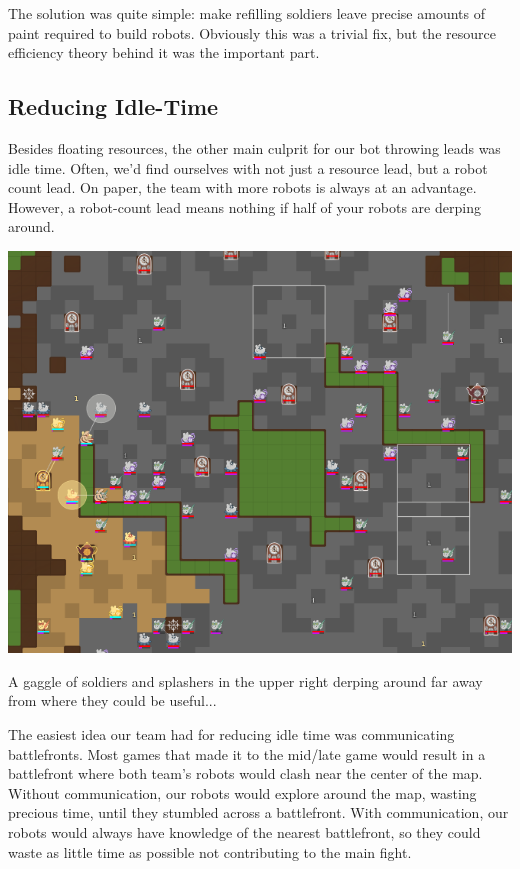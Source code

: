 \medskip

The solution was quite simple: make refilling soldiers leave precise amounts of paint required to build robots. Obviously this was a trivial fix, but the resource efficiency theory behind it was the important part.

\subsection{Reducing Idle-Time}

Besides floating resources, the other main culprit for our bot throwing leads was idle time. Often, we'd find ourselves with not just a resource lead, but a robot count lead. On paper, the team with more robots is always at an advantage. However, a robot-count lead means nothing if half of your robots are derping around.

\begin{center}
    \includegraphics[scale=0.1]{images/idle_time.png}
    \caption{A gaggle of soldiers and splashers in the upper right derping around far away from where they could be useful...}
\end{center}

\medskip

The easiest idea our team had for reducing idle time was communicating battlefronts. Most games that made it to the mid/late game would result in a battlefront where both team's robots would clash near the center of the map. Without communication, our robots would explore around the map, wasting precious time, until they stumbled across a battlefront. With communication, our robots would always have knowledge of the nearest battlefront, so they could waste as little time as possible not contributing to the main fight.

